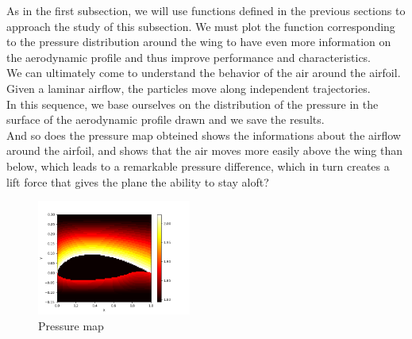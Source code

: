 As in the first subsection, we will use functions defined in the previous sections to approach the study of this subsection.
We must plot the function corresponding to the pressure distribution around the wing to have even more information on the aerodynamic profile and thus improve performance and characteristics.\\
We can ultimately come to understand the behavior of the air around the airfoil.\\
Given a laminar airflow, the particles move along independent trajectories.\\
In this sequence, we base ourselves on the distribution of the pressure in the surface of the aerodynamic profile drawn and we save the results.\\
And so does the pressure map obteined shows the informations about the airflow around the airfoil, and shows that the air moves more easily above the wing than below, which leads to a remarkable pressure difference, which in turn creates a lift force that gives the plane the ability to stay aloft?\\
\begin{figure}[h]
  \centering
  \includegraphics[width=0.45\textwidth]{img/pressure_map.png}
  \caption{Pressure map}
  \label{fig:pressure}
\end{figure}
